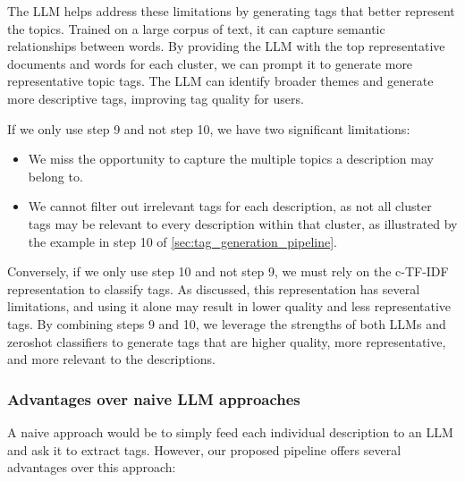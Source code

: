 The LLM helps address these limitations by generating tags that better represent the topics. Trained on a large corpus of text, it can capture semantic relationships between words. By providing the LLM with the top representative documents and words for each cluster, we can prompt it to generate more representative topic tags. The LLM can identify broader themes and generate more descriptive tags, improving tag quality for users.

If we only use step 9 and not step 10, we have two significant limitations:
\begin{itemize}
    \item We miss the opportunity to capture the multiple topics a description may belong to.
    \item We cannot filter out irrelevant tags for each description, as not all cluster tags may be relevant to every description within that cluster, as illustrated by the example in step 10 of \cref{sec:tag_generation_pipeline}.
\end{itemize}

Conversely, if we only use step 10 and not step 9, we must rely on the c-TF-IDF representation to classify tags. As discussed, this representation has several limitations, and using it alone may result in lower quality and less representative tags. By combining steps 9 and 10, we leverage the strengths of both LLMs and zeroshot classifiers to generate tags that are higher quality, more representative, and more relevant to the descriptions.

\subsubsection{Advantages over naive LLM approaches}
A naive approach would be to simply feed each individual description to an LLM and ask it to extract tags. However, our proposed pipeline offers several advantages over this approach:

